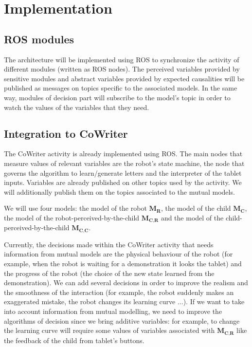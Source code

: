 \documentclass[10pt,a4paper]{article}
\begin{document}
\section{Implementation}

\subsection{ROS modules}

The architecture will be implemented using ROS to synchronize the activity of different modules (written as ROS nodes). The perceived variables provided by sensitive modules and abstract variables provided by expected causalities will be published as messages on topics specific to the associated models. In the same way, modules of decision part will subscribe to the model's topic in order to watch the values of the variables that they need. 

\subsection{Integration to CoWriter}

The CoWriter activity is already implemented using ROS. The main nodes that measure values of relevant variables are the robot's state machine, the node that governs the algorithm to learn/generate letters and the interpreter of the tablet inputs. Variables are already published on other topics used by the activity. We will additionally publish them on the topics associated to the mutual models. 

We will use four models: the model of the robot $\textbf{M}_\textbf{R}$, the model of the child $\textbf{M}_\textbf{C}$, the model of the robot-perceived-by-the-child $\textbf{M}_\textbf{C,R}$ and the model of the child-perceived-by-the-child $\textbf{M}_\textbf{C,C}$.

Currently, the decisions made within the CoWriter activity that needs information from mutual models are the physical behaviour of the robot (for example, when the robot is waiting for a demonstration it looks the tablet) and the progress of the robot (the choice of the new state learned from the demonstration). We can add several decisions in order to improve the realism and the smoothness of the interaction (for example, the robot suddenly makes an exaggerated mistake, the robot changes its learning curve ...). If we want to take into account information from mutual modelling, we need to improve the algorithms of decision since we bring additive variables: for example, to change the learning curve will require some values of variables associated with $\textbf{M}_\textbf{C,R}$ like the feedback of the child from tablet's buttons.
\end{document}
